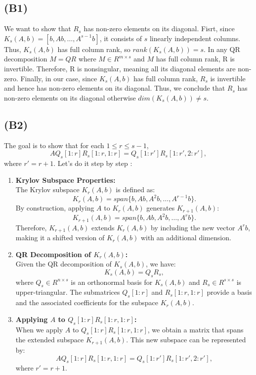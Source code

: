\documentclass{article}
\begin{document}
\subsection*{(B1)}
We want to show that $ R_s $ has non-zero elements on its diagonal.
Fisrt, since $ K_s(A, b) = [b, Ab, \dots, A^{s-1}b] $, it consists of $ s $ linearly independent columns. Thus, $ K_s(A, b) $ has full column rank,
 so $ rank(K_s(A, b)) = s $.
In any QR decomposition $ M = QR$ where $ M \in R^{m \times s} $ and $ M $ has full column rank, R is invertible. 
Therefore, R is nonsingular, meaning all its diagonal elements are non-zero.
Finally, in our case, since $ K_s(A, b) $ has full column rank, $R_s $ is invertible and hence has non-zero elements on its diagonal.
Thus, we conclude that $ R_s $ has non-zero elements on its diagonal otherwise $dim(K_s (A,b)) \neq s$.

\subsection*{(B2)}
The goal is to show that for each $ 1 \leq r \leq s - 1 $,
\[
A Q_s[1:r] R_s[1:r, 1:r] = Q_s[1:r'] R_s[1:r', 2:r'],
\]
where $ r' = r + 1 $.
Let's do it step by step : 
\begin{enumerate}
    \item \textbf{Krylov Subspace Properties:} \\
    The Krylov subspace $ K_r(A, b) $ is defined as:
    \[
    K_r(A, b) = span\{b, Ab, A^2b, \dots, A^{r-1}b\}.
    \]
    By construction, applying $ A $ to $ K_r(A, b) $ generates $ K_{r+1}(A, b) $:
    \[
    K_{r+1}(A, b) = span\{b, Ab, A^2b, \dots, A^r b\}.
    \]
    Therefore, $ K_{r+1}(A, b) $ extends $ K_r(A, b) $ by including the new vector $ A^r b $, making it a shifted version of $ K_r(A, b) $ with an additional dimension.

    \item \textbf{QR Decomposition of $ K_r(A, b) $:} \\
    Given the QR decomposition of $ K_s(A, b) $, we have:
    \[
    K_s(A, b) = Q_s R_s,
    \]
    where $ Q_s \in R^{n \times s} $ is an orthonormal basis for $ K_s(A, b) $ and $ R_s \in R^{s \times s} $ is upper-triangular. The submatrices $ Q_s[1:r] $ and $ R_s[1:r, 1:r] $ provide a basis and the associated coefficients for the subspace $ K_r(A, b) $.

    \item \textbf{Applying $ A $ to $ Q_s[1:r] R_s[1:r, 1:r] $:} \\
    When we apply $ A $ to $ Q_s[1:r] R_s[1:r, 1:r] $, we obtain a matrix that spans the extended subspace $ K_{r+1}(A, b) $. This new subspace can be represented by:
    \[
    A Q_s[1:r] R_s[1:r, 1:r] = Q_s[1:r'] R_s[1:r', 2:r'],
    \]
    where $ r' = r + 1 $. 
\end{enumerate}
\end{document}
